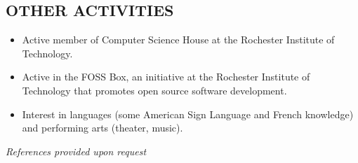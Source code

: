\documentclass[line]{res}
\begin{document}
\begin{resume}
\section{OTHER ACTIVITIES}
	\begin{itemize}[leftmargin=10pt]
	\item Active member of Computer Science House at the Rochester Institute of Technology.
	\item Active in the FOSS Box, an initiative at the Rochester Institute of Technology that promotes open source software development.
	\item Interest in languages (some American Sign Language and French knowledge) and performing arts (theater, music).
	\end{itemize}

\begin{center}
\vspace{-0.26in}
\emph{References provided upon request\\[8pt]}
\end{center}

\end{resume}
\end{document}
